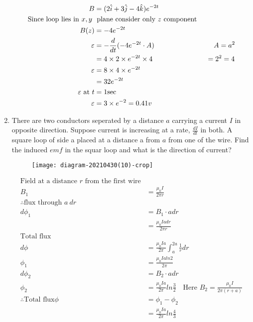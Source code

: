 \begin{enumerate}[ label=\color{ocre}\textbf{\arabic*.}]
\begin{answer}
\begin{align*}
		B&=(2\hat{i}+3 \hat{j} -4 \hat{k})e^{-2 t}\\
		\text{Since loop lies in $x,y$  }&\text{ plane  consider only $z$ component}\\
		B(z)&=-4 e^{-2 t}\\
		\varepsilon&=-\frac{d} {dt}(-4 e^{-2 t}\cdot A) \hspace{3cm}A=a^{2}\\
		&=4 \times 2 \times e^{-2 t} \times 4\hspace{2.7cm}=2^{2}=4\\
		\varepsilon&=8 \times 4 \times e^{-2 t}\\
		&=32 e^{-2 t}\\
		\varepsilon \text{ at } t&=1 \mathrm{sec}\\
		\varepsilon&=3 \times e^{-2}=0.41v
		\end{align*}
	\end{answer}
	\item There are two conductors seperated by a distance $a$ carrying a current $I$ in opposite direction. Suppose current is increasing at a rate, $\frac{dI}{dt}$ in both. A square loop of side a placed at a distance a from $a$ from one of the wire. Find the induced $emf$ in the squar loop and what is the direction of current?
	\begin{figure}[H]
		\begin{center}
			\texttt{[image: diagram-20210430(10)-crop]}
		\end{center}
	\end{figure}
	\begin{answer}
		\begin{align*}
		\text{Field at a distance $r$ from the first wire}\\
		B_1&=\frac{\mu_0I}{2\pi r}\\
		\therefore \text{flux through $a\ dr$}\\
		d\phi_1&=B_1\cdot adr\\
		&=\frac{\mu_0Iadr}{2\pi r}\\
		\text{Total flux}\\
		d\phi&=\frac{\mu_0Ia}{2\pi}\int_{a}^{2a}\frac{1}{r}d
		r\\
		\phi_1&=\frac{\mu_0Ialn2}{2\pi}\\
		d\phi_2&=B_2\cdot adr\\	
		\phi_2&=\frac{\mu_0Ia}{2\pi}ln\frac{3}{2}\quad \text{Here } B_2=\frac{\mu_0I}{2\pi (r+a)}\\
		\therefore\text{Total flux}	 {\phi}&=\phi_1-\phi_2\\&=\frac{\mu_0Ia}{2\pi}ln\frac{4}{3}\\

\end{align*}
\end{answer}
\end{enumerate}
